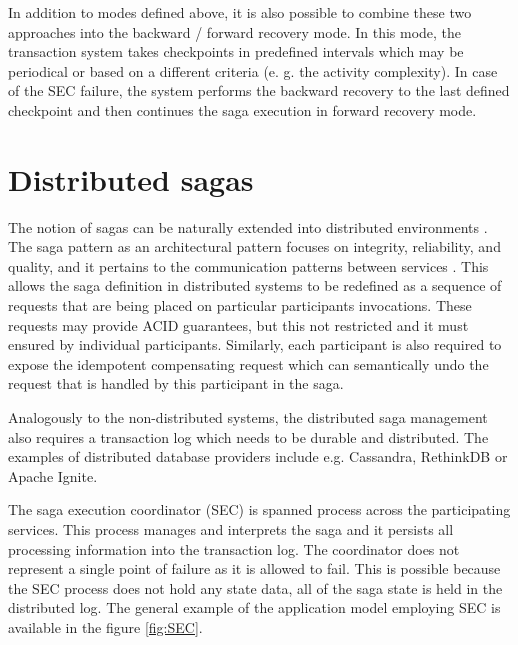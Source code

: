 \documentclass[oneside,
  digital, %
  table,   %
  nolof,     %
  nolot,     %
]{fithesis3}
\begin{document}
\hfill \break

In addition to modes defined above, it is also possible to combine these two approaches into the backward / forward recovery mode. In this mode, the transaction system takes checkpoints in predefined intervals which may be periodical or based on a different criteria (e. g. the activity complexity). In case of the SEC failure, the system performs the backward recovery to the last defined checkpoint and then continues the saga execution in forward recovery mode.

\section{Distributed sagas}

The notion of sagas can be naturally extended into distributed environments \cite{sagas_publ}. The saga pattern as an architectural pattern focuses on integrity, reliability, and quality, and it pertains to the communication patterns between services \cite{prac_ms}. This allows the saga definition in distributed systems to be redefined as a sequence of requests that are being placed on particular participants invocations. These requests may provide ACID guarantees, but this not restricted and it must ensured by individual participants. Similarly, each participant is also required to expose the idempotent compensating request which can semantically undo the request that is handled by this participant in the saga.

Analogously to the non-distributed systems, the distributed saga management also requires a transaction log which needs to be durable and distributed. The examples of distributed database providers include e.g. Cassandra, RethinkDB or Apache Ignite.

The saga execution coordinator (SEC) is spanned process across the participating services. This process manages and interprets the saga and it persists all processing information into the transaction log. The coordinator does not represent a single point of failure as it is allowed to fail. This is possible because the SEC process does not hold any state data, all of the saga state is held in the distributed log. The general example of the application model employing SEC is available in the figure \ref{fig:SEC}.
\end{document}
